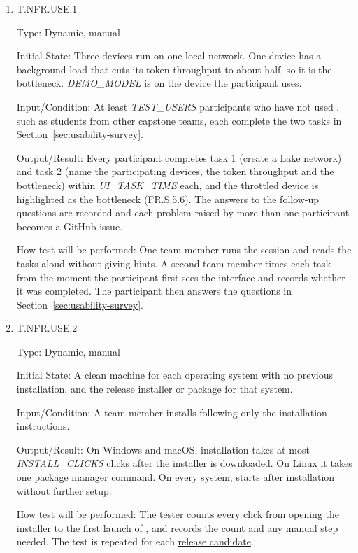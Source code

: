 \documentclass[12pt, titlepage]{article}
\providecommand{\glink}[2]{\hyperlink{gls:#1}{#2}}
\begin{document}
\begin{enumerate}

\item{T.NFR.USE.1\\}
\label{T.NFR.USE.1}

Type: Dynamic, manual

Initial State: Three devices run \progname{} on one local network. One device
has a background load that cuts its token throughput to about half, so it is
the bottleneck. \textit{DEMO\_MODEL} is on the device the participant uses.

Input/Condition: At least \textit{TEST\_USERS} participants who have not used
\progname{}, such as students from other capstone teams, each complete the two
tasks in Section~\ref{sec:usability-survey}.

Output/Result: Every participant completes task 1 (create a Lake network) and
task 2 (name the participating devices, the token throughput and the
bottleneck) within \textit{UI\_TASK\_TIME} each, and the throttled device is
highlighted as the bottleneck (FR.S.5.6). The answers to the follow-up
questions are recorded and each problem raised by more than one participant
becomes a GitHub issue.

How test will be performed: One team member runs the session and reads the
tasks aloud without giving hints. A second team member times each task from
the moment the participant first sees the interface and records whether it was
completed. The participant then answers the questions in
Section~\ref{sec:usability-survey}.

\item{T.NFR.USE.2\\}
\label{T.NFR.USE.2}

Type: Dynamic, manual

Initial State: A clean machine for each operating system with no previous
\progname{} installation, and the release installer or package for that
system.

Input/Condition: A team member installs \progname{} following only the
installation instructions.

Output/Result: On Windows and macOS, installation takes at most
\textit{INSTALL\_CLICKS} clicks after the installer is downloaded. On Linux it
takes one package manager command. On every system, \progname{} starts after
installation without further setup.

How test will be performed: The tester counts every click from opening the
installer to the first launch of \progname{}, and records the count and any
manual step needed. The test is repeated for each \glink{rc}{release candidate}.

\end{enumerate}
\end{document}
